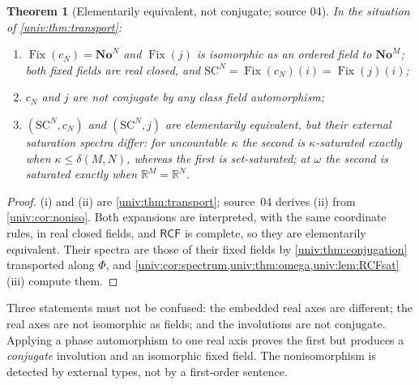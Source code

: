 \documentclass[11pt,letterpaper]{article}
\numberwithin{equation}{section}
\newtheorem{theorem}{Theorem}[section]
\theoremstyle{definition}
\theoremstyle{remark}
\newcommand{\No}{\mathbf{No}}
\newcommand{\SC}{\mathrm{SC}}
\newcommand{\NoM}{\No^{M}}
\newcommand{\NoN}{\No^{N}}
\newcommand{\SCN}{\SC^{N}}
\newcommand{\R}{\mathbb R}
\newcommand{\Fix}{\operatorname{Fix}}
\newcommand{\RCF}{\mathsf{RCF}}
\begin{document}
\begin{theorem}[Elementarily equivalent, not conjugate; source 04]\label{univ:thm:involutions}
In the situation of \cref{univ:thm:transport}:
\begin{enumerate}[label=\textnormal{(\roman*)}]
\item $\Fix(c_N)=\NoN$ and $\Fix(j)$ is isomorphic as an ordered field to
$\NoM$; both fixed fields are real closed, and $\SCN=\Fix(c_N)(i)=\Fix(j)(i)$;
\item $c_N$ and $j$ are not conjugate by any class field automorphism;
\item $(\SCN,c_N)$ and $(\SCN,j)$ are elementarily equivalent, but their
external saturation spectra differ: for uncountable $\kappa$ the second is
$\kappa$-saturated exactly when $\kappa\le\delta(M,N)$, whereas the first is
set-saturated; at $\omega$ the second is saturated exactly when $\R^M=\R^N$.
\end{enumerate}
\end{theorem}
\begin{proof}
(i) and (ii) are \cref{univ:thm:transport}; source~04 derives (ii) from
\cref{univ:cor:noniso}. Both expansions are interpreted, with the same
coordinate rules, in real closed fields, and $\RCF$ is complete, so they are
elementarily equivalent. Their spectra are those of their fixed fields by
\cref{univ:thm:conjugation} transported along $\Phi$, and
\cref{univ:cor:spectrum,univ:thm:omega,univ:lem:RCFsat}(iii) compute them.
\end{proof}

Three statements must not be confused: the embedded real axes are different;
the real axes are not isomorphic as fields; and the involutions are not
conjugate. Applying a phase automorphism to one real axis proves the first but
produces a \emph{conjugate} involution and an isomorphic fixed field. The
nonisomorphism is detected by external types, not by a first-order sentence.
\end{document}
